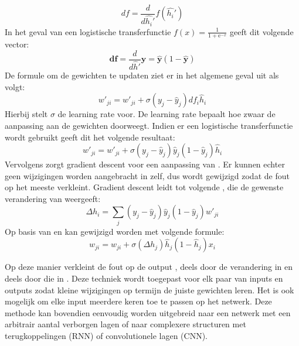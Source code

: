 \begin{equation}
df = \frac{d}{d\hat{h_i}'}f(\hat{h_i}')
\end{equation}
In het geval van een logistische transferfunctie $f(x) = \frac{1}{1 + \mathrm e^{-x}}$ geeft dit volgende vector:
\begin{equation}
  \mathbf{df} = \frac{d}{d\hat{h}'}\mathbf{\hat{y}} = \mathbf{\hat{y}}(1-\mathbf{\hat{y}})
\end{equation}
De formule om de gewichten te updaten ziet er in het algemene geval uit als volgt:
\begin{equation}
  w'_{ji} = w'_{ji} + \sigma(y_j-\hat{y}_j)df_i\hat{h}_i
\end{equation}
Hierbij stelt $\sigma$ de learning rate voor. De learning rate bepaalt hoe zwaar de aanpassing aan de gewichten doorweegt.
Indien er een logistische transferfunctie wordt gebruikt geeft dit het volgende resultaat:
\begin{equation}
    w'_{ji} = w'_{ji} + \sigma(y_j-\hat{y}_j)\hat{y}_j(1-\hat{y}_j)\hat{h}_i
\end{equation}
Vervolgens zorgt gradient descent voor een aanpassing van . Er kunnen echter geen wijzigingen worden aangebracht in  zelf, dus  wordt gewijzigd zodat de fout op  het meeste verkleint. Gradient descent leidt tot volgende , die de gewenste verandering van  weergeeft:
\begin{equation}
    \Delta h_i = \sum\limits_{j}(y_j-\hat{y}_j)\hat{y}_j(1-\hat{y}_j)w'_{ji}
\end{equation}
Op basis van  en  kan  gewijzigd worden met volgende formule:
\begin{equation}
    w_{ji} = w_{ji} + \sigma(\Delta h_j)\hat{h}_j(1-\hat{h}_j)x_i
\end{equation}

Op deze manier verkleint de fout op de output , deels door de verandering in  en deels door die in .
Deze techniek wordt toegepast voor elk paar van inputs en outputs zodat kleine wijzigingen op termijn de juiste gewichten leren. Het is ook mogelijk om elke input meerdere keren toe te passen op het netwerk. Deze methode kan bovendien eenvoudig worden uitgebreid naar een netwerk met een arbitrair aantal verborgen lagen of naar complexere structuren met terugkoppelingen (RNN) of convolutionele lagen (CNN).

